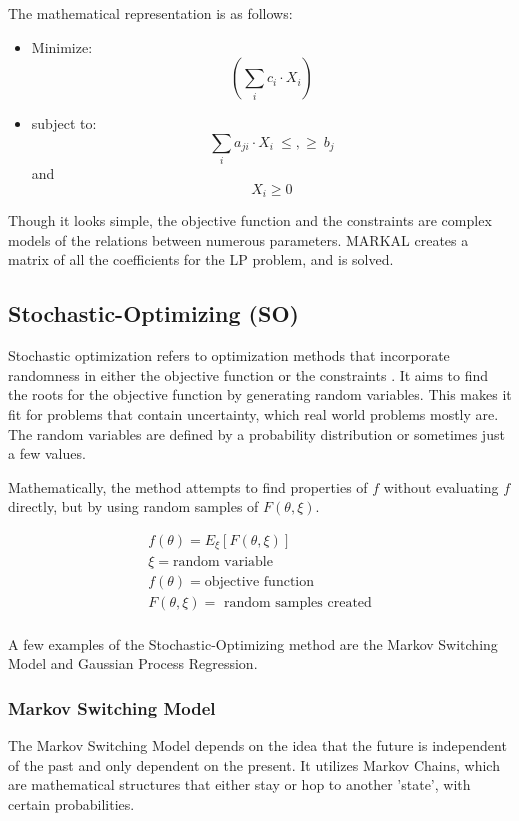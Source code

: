 The mathematical representation is as follows:

\begin{itemize}
	\item[] Minimize:
	\[(\sum_i c_i \cdot X_i) \]
	\item[]subject to:
	\[ \sum_i a_{ji} \cdot X_i \ \leq , \geq \  b_j \] \quad \textrm{and} \quad \[ 	X_i \geq 0 \]
	
\end{itemize}
	
	

Though it looks simple, the objective function and the
constraints are complex models of the relations between
numerous parameters. \gls{MARKAL} creates a matrix
of all the coefficients for the \gls{LP} problem, and is
solved. 


\subsection{Stochastic-Optimizing (SO)}
Stochastic optimization refers to optimization methods
that incorporate randomness in either the objective function
or the constraints \cite{lauren_stochastic_2015}. It aims to find
the roots for the objective function by generating random variables.
This makes it fit for problems that contain uncertainty, which
real world problems mostly are. 
The random variables are defined by a probability distribution
or sometimes just a few values.

Mathematically, the method attempts to find properties of $f$ without
evaluating $f$ directly, but by using random samples of $F(\theta, \xi).$

\begin{align}
	f(\theta)= E_{\xi} [F(\theta, \xi)] \\
	\xi = \mbox{random variable} \\
	f(\theta) = \mbox{objective function} \\
	F(\theta,\xi) = \mbox{ random samples created} \\
\end{align}

A few examples of the Stochastic-Optimizing method are
the Markov Switching Model and Gaussian Process Regression.


\subsubsection{Markov Switching Model}
The Markov Switching Model depends on the idea that
the future is independent of the past and only dependent
on the present. It utilizes Markov Chains, which 
are mathematical structures that either stay or hop to another
'state', with certain probabilities.

